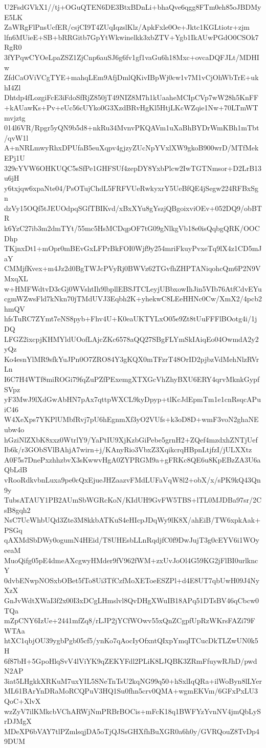 U2FsdGVkX1//tj+OGuQTEN6DE3BtxBDnLi+bhaQve6qgg8FTm0eh85oJBDMyE5LK
ZaWRgFlPnsUcfER/csjCI9T4ZUqIqzslKlz/ApkFxle0Oe+Jktc1KGLtiotr+zjm
lfn6MUieE+SB+bRRGitb7GpYtWkwinelkk3xbZTV+Ygb1IkAUwPGdO0CSOk7RgR0
3fYPqwCYOeLpaZSZ1ZjCnp6auSJ6g6fv1gf1vaGu6h18Mxc+ovcaDQFJLt/MDHIw
ZfdCaOViVCgTYE+mahqLEm9AfjDmlQKivIBpWj0cw1v7M1vCjOhWbTrE+ukhI4Zl
Dhtdp4fLozgiFcE3iFdoSfRjZ850jT49NIZ8M7h1kUaaheMCIpCVp7wW28h5KnFF
+kAUawKs+Pv+eUc56cUYko0G3XzdBRvHgKl5HtjLKcWZqie1Nw+70LTmWTmvjztg
014l6VR/Rpgr5yQN9b5d8+nkRu34MvnvPKQAVm1uXaBhBYDrWmKBh1mTbt/qvW1l
A+nNRLmwyRhxDPUfaB5euXqpv4gjzyZUcNpYVxlXW9gkoB900wrD/MTfMekEPj1U
329cYVW6OHKUQC5sSfPe1GHFSUf4zepDY8YxbPlcw2IwTGTNmsor+D2LrB13u6jH
y6txjqw6xpaNte04/PsOTujChdL5FRFVUeRwkyxrY5UeBfQE4jSegw224RFBxSgn
dzVy15OQf5tJEUOdpqSGfTBIKvd/xBxXYu8gYszjQBgoixviOEv+052DQ9/obBTR
k6YzC27ib3m2dmTYt/55mc5HsMCDqpOF7tG09gNlkgVb18e0isQqbgQRK/OOCDhp
TKjnxDt1+mOpr0mBEvGxLFPrBkFOI0Wjf9y254mriFkuyPvxeTq9lX4z1CD5mJaY
CMMjfKvex+m4Jz2d0BgTWJcPVyRj0BWVz62TGvfhZHPTANiqohcQm6P2N9VMxqXL
w+HMFWdtvD3cGj0WVshtIh9lbpllEBSJTCLeyjUBbxowIhJin5VIb76AtfCdvEYu
cgmWZwsFld7kNkn70jTMdUVJ3Eqbh2K+yhekwC8LEeHHNc0Cw/XmX2/4pcb2hmQV
hfsTuRC7ZYmt7eNS8pyb+Fhv4U+K0eaUKTYLxO05e9Zt8tUuFFFlBOotg4i/1jDQ
LFGZ2ixcpjKHMYldUOofLAjcZKc6578aQQ27SBgFLYmSkIAiqEo04OwmdA2y2yQz
Ko4esnYlMR9sfkYuJPn0O7ZRO84Y3gKQX0mTFzrT48OrID2pjbzVdMehNlzRVrLn
I6C7H4WTf8miROGi79fqZuPZfPExemgXTXGcVhZhyBXU6ERY4qrvMknkGypfSVpz
yF3MwJ9lXdGwAbHN7pAx7qttpWXCL9kyDpyp+tlKcJdEpmTm1e1cnRsqcAPuiC46
W4XeXps7YKPlUMbfRvj7pU6hEgnmXf3yO2VUfs+k3oD8D+wmF3voN2ghaNEubw4o
hGziNlZXbK8xxz0WtrlY9/YaPtIU9XjKzbGiPebe5grnH2+ZQef4mzdxhZNTjUef
Ib6k/r3GObSVlBAhjA7wirn+j/KAnyRio3VbxZ3XqikcrqHBpnLtjfzI/jULXXtz
A0F5s7DnePxzhhzbvX3sKwwvHgA0ZYPRGM9a+gFRKc8QE6u8KpEBzZA3U6aQbLdB
vRooRdkvbnLuxa9pe0cQxEjueJHZaazvFMdLUFaVqW8l2+obX/x/sPK9kQ43Qn9y
TubsATAUY1PB2AUmSbWGRcKoN/KIdUH9GvFW5TBS+lTL0MJDBa97sr/2CsB8gqh2
NsC7UcWhbUQd3Zte3M8kkbATKuS4eHIcpJDqWy9lK8X/ahEiB/TW6xpkAak+PSGq
qAXMdSbDWy0ogumN4HEid/T8UHEsbLLnRqdjfC0f9DwJujT3g0cEYV6i1WOyeeaM
MuoQifg05pE4dmeAXcgwyHMder9fV962fWM+zxUvJoOl4G59KG2jFlBI0urlkncY
0dvbENwpNOSxbOBet5fTo8Ui3TfCzfMoXEToeESZPl+d4E8UT7qbUwH09J4NyXzX
GnJvWdtXWaI3f2x00I3xDCgLHmslvl8QvDHgXWuIB18APq51DTsBV46qCbcw0TQa
mZpCNY6IzUe+2441mfZq8/rLJP2jYCfWOwv55xQnZCgpfUpRzWKrsFAZi79FWTAa
htXC1qbjOU39ygbPgb05cf5/ynKo7qAocIyOfxntQIxpYmqITCucDkTLZwUN0k5H
6f87bH+5GpoHlqSvV4lViYK9qZEKYFdl2PLiK8LJQBK3ZRmFfuywRJhD/pwdN2AP
3iat5LHgkkXRKuM7uxYIL5SNeTnTsU2kqNG99q50+hSxlIqQRa+ilWoByn8lLYer
ML61BArYnDRaMoRCQPuV3HQ1Su0fhn5crv0QMA+wgmEKVm/6GFxPxLU3QoC+XlvX
wzZyV7ilKMkcbVChARWjNmPRBrBOCis+mFcK18q1BWFYzYvnNV4jmQbLySrDJMgX
MDeXP6bVAY7tlPZmlsqjDA5oTjQJSsGHXfhBuXGR0a6h0y/GVRQouZ8TvDp49DUM
